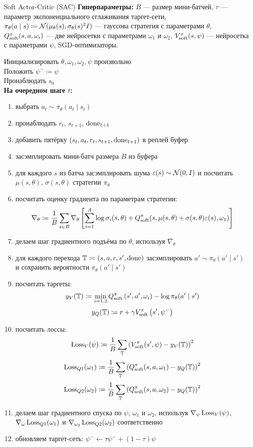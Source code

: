 \begin{algorithm}[label = SACalgorithm]{Soft Actor-Critic (SAC)}
\textbf{Гиперпараметры:} $B$ --- размер мини-батчей, $\tau$ --- параметр экспоненциального сглаживания таргет-сети, $\pi_{\theta}(a \mid s) \coloneqq \mathcal{N}(\mu_{\theta}(s), \sigma_{\theta}(s)^2 I)$ --- гауссова стратегия с параметрами $\theta$, $Q^\pi_{\mathrm{soft}}(s, a, \omega_i)$ --- две нейросетки с параметрами $\omega_1$ и $\omega_2$, $V^\pi_{\mathrm{soft}}(s, \psi)$ --- нейросетка с параметрами $\psi$, SGD-оптимизаторы.

\vspace{0.3cm}
Инициализировать $\theta, \omega_1, \omega_2, \psi$ произвольно \\
Положить $\psi^- \coloneqq \psi$ \\
Пронаблюдать $s_0$ \\
\textbf{На очередном шаге $t$:}
\begin{enumerate}
    \item выбрать $a_t \sim \pi_\theta(a_t \mid s_t)$
    \item пронаблюдать $r_t$,  $s_{t+1}$, $\mathrm{done}_{t+1}$
    \item добавить пятёрку $(s_t, a_t, r_t, s_{t+1}, \mathrm{done}_{t+1})$ в реплей буфер
    \item засэмплировать мини-батч размера $B$ из буфера
    \item для каждого $s$ из батча засэмплировать шума $\varepsilon(s) \sim \mathcal{N}(0, I)$ и посчитать $\mu(s, \theta)$, $\sigma(s, \theta)$ стратегии $\pi_\theta$
    \item посчитать оценку градиента по параметрам стратегии:
    $$\nabla_\theta \coloneqq \frac{1}{B}\sum_{s \in B} \nabla_\theta \left[ \sum_{i=1}^A \log \sigma_i(s, \theta) + Q^\pi_{\mathrm{soft}}(s, \mu(s, \theta) + \sigma(s, \theta) \varepsilon(s), \omega_1) \right]$$
    \item делаем шаг градиентного подъёма по $\theta$, используя $\nabla_\theta$
    \item для каждого перехода $\mathbb{T} \coloneqq (s, a, r, s', \mathrm{done})$ засэмплировать $a' \sim \pi_\theta(a' \mid s')$ и сохранить вероятности $\pi_\theta(a' \mid s')$
    \item посчитать таргеты:
    $$y_V(\mathbb{T} ) \coloneqq \min_{i = 1, 2} Q^\pi_{\mathrm{soft}}\left( s', a', \omega_i \right) - \log \pi_\theta(a' \mid s')$$
    $$y_Q(\mathbb{T} ) \coloneqq r + \gamma V^\pi_{\mathrm{soft}}\left( s', \psi^{-} \right)$$
    \item посчитать лоссы:
    $$\operatorname{Loss}_V(\psi) \coloneqq \frac{1}{B}\sum_{\mathbb{T}} \left( V^\pi_{\mathrm{soft}}(s', \psi) - y_V(\mathbb{T} ) \right) ^2$$
    $$\operatorname{Loss}_{Q1}(\omega_1) \coloneqq \frac{1}{B}\sum_{\mathbb{T}} \left( Q^\pi_{\mathrm{soft}}(s, a, \omega_1) - y_Q(\mathbb{T} ) \right) ^2$$
    $$\operatorname{Loss}_{Q2}(\omega_2) \coloneqq \frac{1}{B}\sum_{\mathbb{T}} \left( Q^\pi_{\mathrm{soft}}(s, a, \omega_2) - y_Q(\mathbb{T} ) \right) ^2$$
    \item делаем шаг градиентного спуска по $\psi$, $\omega_1$ и $\omega_2$, используя $\nabla_\psi \operatorname{Loss}_V(\psi)$, $\nabla_\omega \operatorname{Loss}_{Q1}(\omega_1)$ и $\nabla_{\omega_2} \operatorname{Loss}_{Q2}(\omega_2)$ соответственно
    \item обновляем таргет-сеть: $\psi^{-} \leftarrow \tau \psi^{-} + (1 - \tau) \psi$
\end{enumerate}
\end{algorithm}
